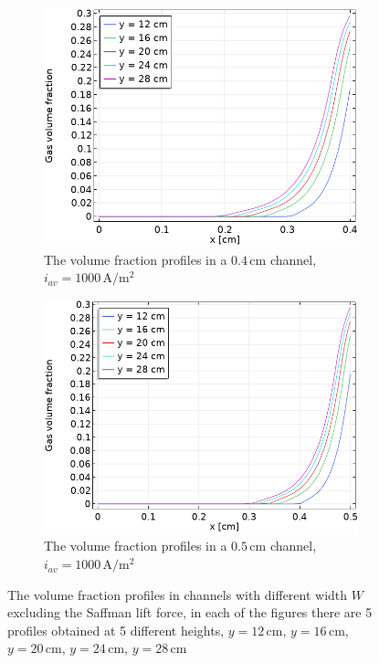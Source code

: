 \begin{figure}[H]
\begin{subfigure}{.5\textwidth}
\end{subfigure}
\begin{subfigure}{.5\textwidth}
  \centering
  \includegraphics[width=1\linewidth]{volumefraction4mm1000Anosaff.png}
  \caption{The volume  fraction profiles in a $0.4 \, \mathrm{cm}$ channel, $i_{av}=1000 \, \mathrm{A/m^2}$}
\end{subfigure}%
\begin{subfigure}{.5\textwidth}
  \centering
  \includegraphics[width=1\linewidth]{volumefraction5mm1000Anosaff.png}
  \caption{The volume fraction profiles in a $0.5 \, \mathrm{cm}$ channel, $i_{av}=1000 \, \mathrm{A/m^2}$}
\end{subfigure}
\caption{The volume fraction profiles in channels with different width $W$ excluding the Saffman lift force, in each of the figures there are 5 profiles obtained at 5 different heights, $y = 12 \, \mathrm{cm}$, $y = 16 \, \mathrm{cm}$, $y = 20 \, \mathrm{cm}$, $y = 24 \, \mathrm{cm}$, $y = 28 \, \mathrm{cm}$}
\label{nosaffvolume}
\end{figure}

